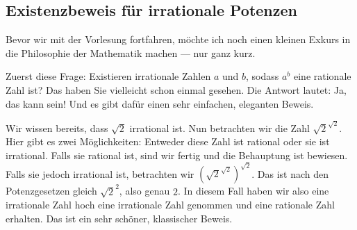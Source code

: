\subsection{Existenzbeweis für irrationale Potenzen}
\begin{spoken-clean}[00:00:39 - 00:01:08]
Bevor wir mit der Vorlesung fortfahren, möchte ich noch einen kleinen Exkurs in die Philosophie der Mathematik machen --- nur ganz kurz.

Zuerst diese Frage: Existieren irrationale Zahlen $a$ und $b$, sodass $a^b$ eine rationale Zahl ist? Das haben Sie vielleicht schon einmal gesehen. Die Antwort lautet: Ja, das kann sein! Und es gibt dafür einen sehr einfachen, eleganten Beweis.

Wir wissen bereits, dass $\sqrt{2}$ irrational ist. Nun betrachten wir die Zahl $\sqrt{2}^{\sqrt{2}}$. Hier gibt es zwei Möglichkeiten: Entweder diese Zahl ist rational oder sie ist irrational. Falls sie rational ist, sind wir fertig und die Behauptung ist bewiesen. Falls sie jedoch irrational ist, betrachten wir $\left(\sqrt{2}^{\sqrt{2}}\right)^{\sqrt{2}}$. Das ist nach den Potenzgesetzen gleich $\sqrt{2}^2$, also genau $2$. In diesem Fall haben wir also eine irrationale Zahl hoch eine irrationale Zahl genommen und eine rationale Zahl erhalten. Das ist ein sehr schöner, klassischer Beweis.
\end{spoken-clean}

